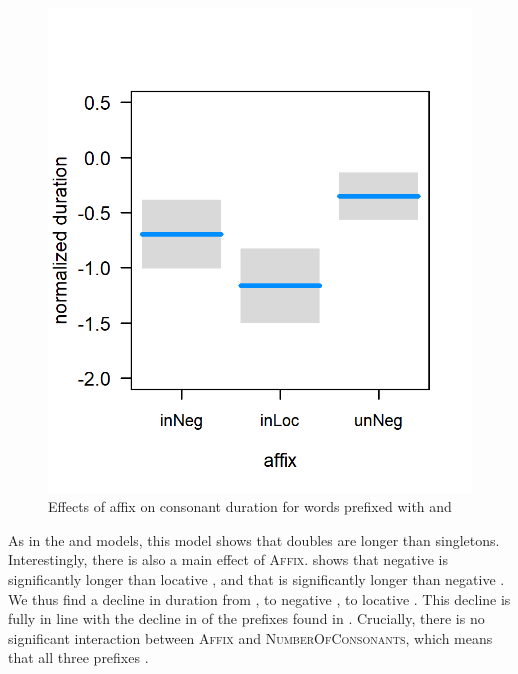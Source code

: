 \begin{figure}
	
	
	\includegraphics[scale=0.8] {images/Corpus/unInModel.png}
	\caption{Effects of  affix on consonant duration for words prefixed with  and }
	\label{fig:inUnModel}
\end{figure}



As in the  and models, this model shows that doubles are longer than singletons. Interestingly, there is also  a  main effect of \textsc{Affix}.  shows that negative  is significantly longer than locative , and that  is significantly longer than negative .  We thus find a decline in duration from , to negative , to locative . This decline is fully in line with the decline in  of the prefixes found in . Crucially, there is no significant interaction between \textsc{Affix} and \textsc{NumberOfConsonants}, which means that all three prefixes .

